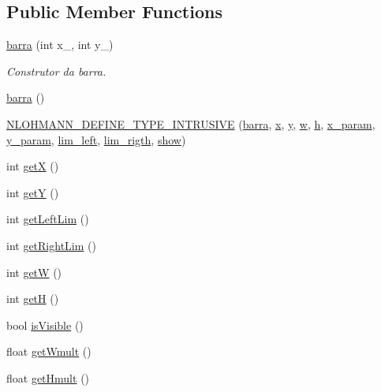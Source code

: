 \subsection*{Public Member Functions}
\begin{DoxyCompactItemize}
\item 
\hyperlink{classbarra_a5acfb9b82a30794e040d4f156562317c}{barra} (int x\+\_\+, int y\+\_\+)
\begin{DoxyCompactList}\small\item\em Construtor da barra. \end{DoxyCompactList}\item 
\hyperlink{classbarra_a2c2e10e1b5a443af251cc29e8480ceb9}{barra} ()
\item 
\hyperlink{classbarra_a6c1099038386c0fd206319dd71fcf030}{N\+L\+O\+H\+M\+A\+N\+N\+\_\+\+D\+E\+F\+I\+N\+E\+\_\+\+T\+Y\+P\+E\+\_\+\+I\+N\+T\+R\+U\+S\+I\+VE} (\hyperlink{classbarra}{barra}, \hyperlink{classbarra_a60f0c711fd29434f3fb07a3f584a83a1}{x}, \hyperlink{classbarra_a93b604008af3593ac1b80366c387f2e9}{y}, \hyperlink{classbarra_a31fd53ae11742f912eb9e0b20707cb82}{w}, \hyperlink{classbarra_add2a64a98c1781d1cc9b7b1f744df1a5}{h}, \hyperlink{classbarra_af6bfdf384cdef9648b4ad8e83901308c}{x\+\_\+param}, \hyperlink{classbarra_a90bcebf4760d9c8deba7b0f94aa2a155}{y\+\_\+param}, \hyperlink{classbarra_af750951229deafd940b877200cfe8475}{lim\+\_\+left}, \hyperlink{classbarra_a5582b336cf268a203551806b0c1af495}{lim\+\_\+rigth}, \hyperlink{classbarra_a9e692d2ae2421c2d8cc591d5456790ec}{show})
\item 
int \hyperlink{classbarra_a2f3787aab4304ccd3e5ac813d5387f26}{getX} ()
\item 
int \hyperlink{classbarra_a5eed7412b3afaa38f74ab8ce2e3cf80c}{getY} ()
\item 
int \hyperlink{classbarra_af044e973bc7c1c284a7474ae49a152dc}{get\+Left\+Lim} ()
\item 
int \hyperlink{classbarra_a872b85b7744104ac27724d2975be02aa}{get\+Right\+Lim} ()
\item 
int \hyperlink{classbarra_aad00b16b2f10c8f2e9b11981c44037c6}{getW} ()
\item 
int \hyperlink{classbarra_a640467fe10e4d76eba2cdddf560ac08a}{getH} ()
\item 
bool \hyperlink{classbarra_ad2fd8265fb070b4161862918d56ed437}{is\+Visible} ()
\item 
float \hyperlink{classbarra_a2e8656df299ddc913bcacac2505a6733}{get\+Wmult} ()
\item 
float \hyperlink{classbarra_ac3e797dcb0cfdeba9cb3ff813f16021e}{get\+Hmult} ()

\end{DoxyCompactItemize}

